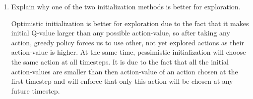 \documentclass{exam}
\begin{document}
\begin{problem}[Exploration]
\begin{enumerate}
    \item Explain why one of the two initialization methods is better for exploration.
    \begin{solutionorlines}[2in]
        Optimistic initialization is better for exploration due to the fact that it makes initial Q-value larger than any possible action-value, so after taking any action, greedy policy forces us to use other, not yet explored actions as their action-value is higher. At the same time, pessimistic initialization will choose the same action at all timesteps. It is due to the fact that all the initial action-values are smaller than then action-value of an action chosen at the first timestep and will enforce that only this action will be chosen at any future timestep.
    \end{solutionorlines}
\end{enumerate}

\end{problem}

\end{document}
